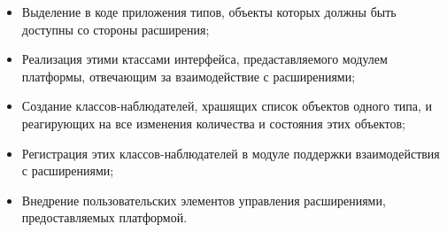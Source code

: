 \begin{itemize}
  \item Выделение в коде приложения типов, объекты которых должны быть доступны со стороны расширения;
  \item Реализация этими ктассами интерфейса, предаставляемого модулем платформы, отвечающим за взаимодействие с расширениями;
  \item Создание классов-наблюдателей, храшящих список объектов одного типа, и реагирующих на все изменения количества и состояния этих объектов;
  \item Регистрация этих классов-наблюдателей в модуле поддержки взаимодействия с расширениями;
  \item Внедрение пользовательских элементов управления расширениями, предоставляемых платформой.
\end{itemize}

\pagebreak
